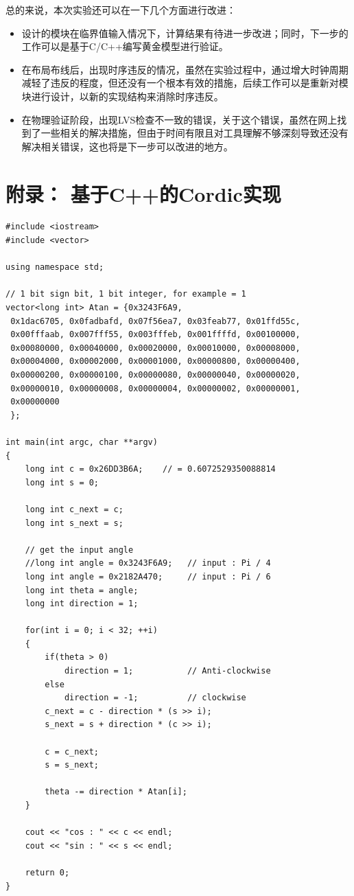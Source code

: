 \documentclass[a4paper,12pt]{report}
\begin{document}
总的来说，本次实验还可以在一下几个方面进行改进：
\begin{itemize}
\item 设计的模块在临界值输入情况下，计算结果有待进一步改进；同时，下一步的工作可以是基于C/C++编写黄金模型进行验证。
\item 在布局布线后，出现时序违反的情况，虽然在实验过程中，通过增大时钟周期减轻了违反的程度，但还没有一个根本有效的措施，后续工作可以是重新对模块进行设计，以新的实现结构来消除时序违反。
\item 在物理验证阶段，出现LVS检查不一致的错误，关于这个错误，虽然在网上找到了一些相关的解决措施，但由于时间有限且对工具理解不够深刻导致还没有解决相关错误，这也将是下一步可以改进的地方。
\end{itemize}

\nocite{*}


\appendix
\section*{附录： 基于C++的Cordic实现}\label{AppendixA}
{
\lstset{style=customCpp}
\footnotesize
\begin{lstlisting}
#include <iostream>
#include <vector>

using namespace std;

// 1 bit sign bit, 1 bit integer, for example = 1
vector<long int> Atan = {0x3243F6A9, 
 0x1dac6705, 0x0fadbafd, 0x07f56ea7, 0x03feab77, 0x01ffd55c, 
 0x00fffaab, 0x007fff55, 0x003fffeb, 0x001ffffd, 0x00100000, 
 0x00080000, 0x00040000, 0x00020000, 0x00010000, 0x00008000,
 0x00004000, 0x00002000, 0x00001000, 0x00000800, 0x00000400, 
 0x00000200, 0x00000100, 0x00000080, 0x00000040, 0x00000020, 
 0x00000010, 0x00000008, 0x00000004, 0x00000002, 0x00000001,
 0x00000000
 };

int main(int argc, char **argv)
{
	long int c = 0x26DD3B6A;    // = 0.6072529350088814
	long int s = 0;

	long int c_next = c;
	long int s_next = s;

	// get the input angle 
	//long int angle = 0x3243F6A9;   // input : Pi / 4 
	long int angle = 0x2182A470;     // input : Pi / 6
	long int theta = angle;
	long int direction = 1;

	for(int i = 0; i < 32; ++i)
	{
		if(theta > 0)
			direction = 1;           // Anti-clockwise
		else
			direction = -1;          // clockwise
		c_next = c - direction * (s >> i);
		s_next = s + direction * (c >> i);

		c = c_next;
		s = s_next;

		theta -= direction * Atan[i];
	}

	cout << "cos : " << c << endl;
	cout << "sin : " << s << endl;

	return 0;
}

\end{lstlisting}
}
\end{document}
